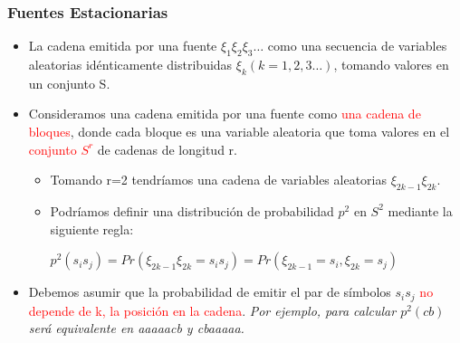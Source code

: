 \documentclass{beamer}
\theoremstyle{plain}
\theoremstyle{example}
\theoremstyle{example}
\begin{document}
\begin{frame} \frametitle{Fuentes Estacionarias} \small 

\begin{itemize}
\item La cadena emitida por una fuente $\xi_1 \xi_2 \xi_3 \ldots$ como una secuencia de variables aleatorias idénticamente distribuidas  $\xi_k  (k = 1, 2, 3 \ldots)$, tomando valores en un conjunto S.

\item Consideramos una cadena emitida por una fuente como \textcolor{red}{una cadena de bloques}, donde cada bloque es una variable aleatoria que toma valores en el \textcolor{red}{conjunto $S^{r}$} de cadenas de longitud r. 

\begin{itemize}
\item Tomando r=2 tendríamos una cadena de variables aleatorias $\xi_{2k-1}\xi_{2k}$. 
\item  Podríamos definir una distribución de probabilidad $p^{2}$ en $S^{2}$ mediante la siguiente regla: 
\begin{center}$p^{2}(s_is_j) = Pr(\xi_{2k-1}\xi_{2k} = s_is_j) = Pr(\xi_{2k-1} = s_i, \xi_{2k} = s_j)$\end{center}

\end{itemize}

\item Debemos asumir que la probabilidad de emitir el par de símbolos $s_i s_j$ \textcolor{red}{no depende de k, la posición en la cadena}. \textit{Por ejemplo, para calcular $p^{2}(cb)$ será equivalente en  aaaaacb y cbaaaaa. }
\end{itemize}

\end{frame} 
\end{document}

